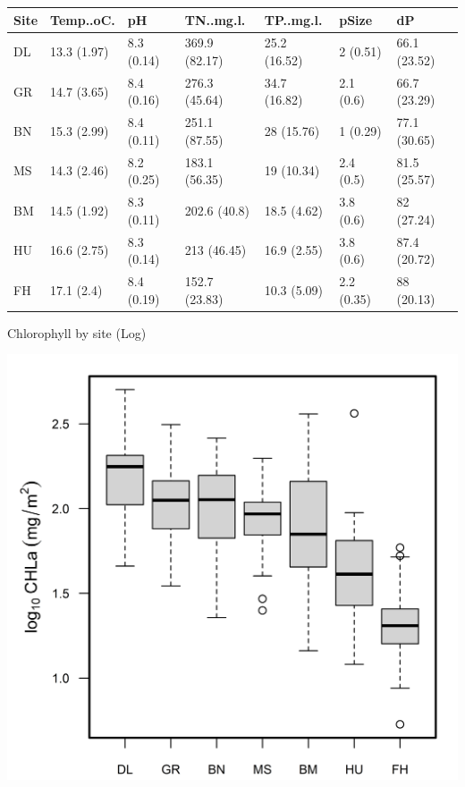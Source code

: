 \documentclass[
]{article}
\let\origfigure\figure
\let\endorigfigure\endfigure
\renewenvironment{figure}[1][2] {
    \expandafter\origfigure\expandafter[H]
} {
    \endorigfigure
}
\begin{document}
\begin{longtable}[]{@{}lllllll@{}}
\toprule()
Site & Temp..oC. & pH & TN..mg.l. & TP..mg.l. & pSize & dP \\
\midrule()
\endhead
DL & 13.3 (1.97) & 8.3 (0.14) & 369.9 (82.17) & 25.2 (16.52) & 2 (0.51)
& 66.1 (23.52) \\
GR & 14.7 (3.65) & 8.4 (0.16) & 276.3 (45.64) & 34.7 (16.82) & 2.1 (0.6)
& 66.7 (23.29) \\
BN & 15.3 (2.99) & 8.4 (0.11) & 251.1 (87.55) & 28 (15.76) & 1 (0.29) &
77.1 (30.65) \\
MS & 14.3 (2.46) & 8.2 (0.25) & 183.1 (56.35) & 19 (10.34) & 2.4 (0.5) &
81.5 (25.57) \\
BM & 14.5 (1.92) & 8.3 (0.11) & 202.6 (40.8) & 18.5 (4.62) & 3.8 (0.6) &
82 (27.24) \\
HU & 16.6 (2.75) & 8.3 (0.14) & 213 (46.45) & 16.9 (2.55) & 3.8 (0.6) &
87.4 (20.72) \\
FH & 17.1 (2.4) & 8.4 (0.19) & 152.7 (23.83) & 10.3 (5.09) & 2.2 (0.35)
& 88 (20.13) \\
\bottomrule()
\end{longtable}

Chlorophyll by site (Log)

\begin{figure}

{\centering \includegraphics[width=1\linewidth]{Manuscript_files/FIGURES/Chla_Boxplots} 

}

\caption{A caption}\label{fig:unnamed-chunk-1}
\end{figure}
\end{document}
